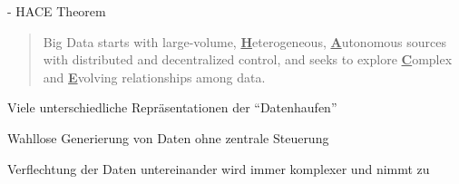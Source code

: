 \documentclass[fleqn,11pt,aspectratio=43]{beamer}
\begin{document}
\begin{frame}{\insertsectionhead - HACE Theorem \cite{wu2014data}}
\begin{quote}
Big Data starts with large-volume, \underline{\textbf{H}}eterogeneous, 
\underline{\textbf{A}}utonomous sources with distributed and decentralized control, 
and seeks to explore \underline{\textbf{C}}omplex and \underline{\textbf{E}}volving relationships 
among data.
\end{quote} %
\begin{description}\setlength{\itemsep}{15pt}
\item[{\parbox[t]{4cm}{Huge Heterogeneous Data:}}] {\parbox[t]{6.3cm}{Viele unterschiedliche Repräsentationen der \enquote{Datenhaufen}}}
\item[{\parbox[t]{4cm}{Autonomous Sources:}}] {\parbox[t]{6.3cm}{Wahllose Generierung von Daten ohne zentrale Steuerung}}
\item[{\parbox[t]{4cm}{Complex and Evolving Relationships:}}] {\parbox[t]{6.3cm}{Verflechtung der Daten untereinander wird immer komplexer und nimmt zu}}
\end{description}
\end{frame}
\end{document}
